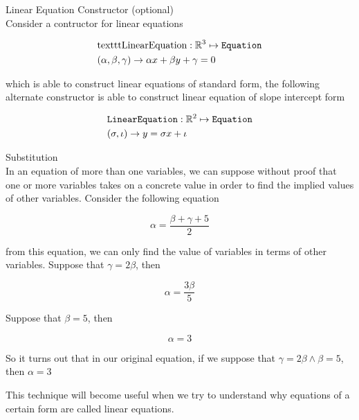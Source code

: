 \documentclass{book}
\begin{document}
  {\remark Linear Equation Constructor (optional) \\
    Consider a contructor for linear equations

    \begin{align*}
      & \text{texttt{LinearEquation}}: \mathbb{R}^3 \mapsto \text{\texttt{Equation}}\\
      & (\alpha, \beta, \gamma) \to \alpha x + \beta y + \gamma = 0
    \end{align*}

    which is able to construct linear equations of standard form, the following alternate constructor is able to construct linear equation of slope intercept form

    \begin{align*}
      & \text{\texttt{LinearEquation}}: \mathbb{R}^2 \mapsto \text{\texttt{Equation}}\\
      & (\sigma, \iota) \to y = \sigma x + \iota
    \end{align*}
  }

  {\remark Substitution \\

    In an equation of more than one variables, we can suppose without proof that one or more variables takes on a concrete value in order to find the implied values of other variables. Consider the following equation

    $$\alpha = \frac{\beta + \gamma + 5}{2}$$

    from this equation, we can only find the value of variables in terms of other variables. Suppose that $\gamma = 2\beta$, then

    $$\alpha = \frac{3\beta}{5}$$

    Suppose that $\beta = 5$, then

    $$\alpha = 3$$

    So it turns out that in our original equation, if we suppose that $\gamma = 2\beta \land \beta = 5$, then $\alpha = 3$

    This technique will become useful when we try to understand why equations of a certain form are called linear equations.
  }\\
\end{document}
